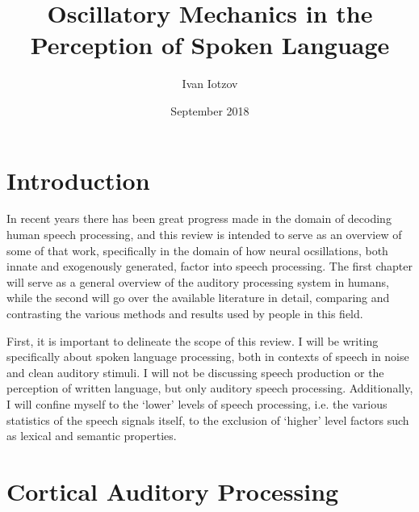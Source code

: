 \documentclass[titlepage]{article}
\title{Oscillatory Mechanics in the Perception of Spoken Language}
\author{Ivan Iotzov}
\date{September 2018}
\begin{document}

\maketitle


\section{Introduction} \label{intro}

  In recent years there has been great progress made in the domain
  of decoding human speech processing, and this review is intended
  to serve as an overview of some of that work, specifically in the 
  domain of how neural ocsillations, both innate and exogenously 
  generated, factor into speech processing. The first chapter will 
  serve as a general overview of the auditory processing system in 
  humans, while the second will go over the available literature in 
  detail, comparing and contrasting the various methods and results 
  used by people in this field. 

  First, it is important to delineate the scope of this review. I 
  will be writing specifically about spoken language processing, 
  both in contexts of speech in noise and clean auditory stimuli.
  I will not be discussing speech production or the perception of 
  written language, but only auditory speech processing. Additionally, 
  I will confine myself to the `lower' levels of speech processing,
  i.e. the various statistics of the speech signals itself, to the 
  exclusion of `higher' level factors such as lexical and semantic 
  properties.

\section{Cortical Auditory Processing} \label{corticalAuditoryProcessing}
\end{document}
